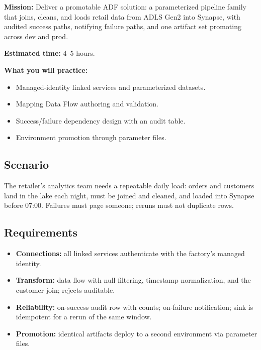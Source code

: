 \begin{capstonebox}
\textbf{Mission:} Deliver a promotable ADF solution: a parameterized pipeline family that joins, cleans, and loads retail data from ADLS Gen2 into Synapse, with audited success paths, notifying failure paths, and one artifact set promoting across dev and prod.

\textbf{Estimated time:} 4--5 hours.

\textbf{What you will practice:}
\begin{itemize}
    \item Managed-identity linked services and parameterized datasets.
    \item Mapping Data Flow authoring and validation.
    \item Success/failure dependency design with an audit table.
    \item Environment promotion through parameter files.
\end{itemize}
\end{capstonebox}

\subsection*{Scenario}
The retailer's analytics team needs a repeatable daily load: orders and customers land in the lake each night, must be joined and cleaned, and loaded into Synapse before 07:00. Failures must page someone; reruns must not duplicate rows.

\subsection*{Requirements}
\begin{itemize}
    \item \textbf{Connections:} all linked services authenticate with the factory's managed identity.
    \item \textbf{Transform:} data flow with null filtering, timestamp normalization, and the customer join; rejects auditable.
    \item \textbf{Reliability:} on-success audit row with counts; on-failure notification; sink is idempotent for a rerun of the same window.
    \item \textbf{Promotion:} identical artifacts deploy to a second environment via parameter files.
\end{itemize}

